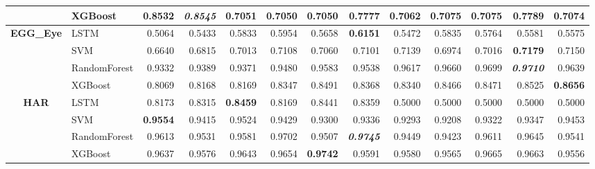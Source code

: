 \begin{table}[H]
\begin{adjustbox}{max width=14cm}
\begin{tabular}{|c|l|r|r|r|r|r|r|r|r|r|r|r|}
			                      & XGBoost      & 0.8532                   & \textit{\textbf{0.8545}} & 0.7051          & 0.7050 & 0.7050          & 0.7777                   & 0.7062                   & 0.7075                   & 0.7075 & 0.7789                   & 0.7074          \\
			\hline
			\textbf{EGG\_Eye}     & LSTM         & 0.5064                   & 0.5433                   & 0.5833          & 0.5954 & 0.5658          & \textbf{0.6151}          & 0.5472                   & 0.5835                   & 0.5764 & 0.5581                   & 0.5575          \\
			                      & SVM          & 0.6640                   & 0.6815                   & 0.7013          & 0.7108 & 0.7060          & 0.7101                   & 0.7139                   & 0.6974                   & 0.7016 & \textbf{0.7179}          & 0.7150          \\
			                      & RandomForest & 0.9332                   & 0.9389                   & 0.9371          & 0.9480 & 0.9583          & 0.9538                   & 0.9617                   & 0.9660                   & 0.9699 & \textit{\textbf{0.9710}} & 0.9639          \\
			                      & XGBoost      & 0.8069                   & 0.8168                   & 0.8169          & 0.8347 & 0.8491          & 0.8368                   & 0.8340                   & 0.8466                   & 0.8471 & 0.8525                   & \textbf{0.8656} \\
			\hline
			\textbf{HAR}          & LSTM         & 0.8173                   & 0.8315                   & \textbf{0.8459} & 0.8169 & 0.8441          & 0.8359                   & 0.5000                   & 0.5000                   & 0.5000 & 0.5000                   & 0.5000          \\
			                      & SVM          & \textbf{0.9554}          & 0.9415                   & 0.9524          & 0.9429 & 0.9300          & 0.9336                   & 0.9293                   & 0.9208                   & 0.9322 & 0.9347                   & 0.9453          \\
			                      & RandomForest & 0.9613                   & 0.9531                   & 0.9581          & 0.9702 & 0.9507          & \textit{\textbf{0.9745}} & 0.9449                   & 0.9423                   & 0.9611 & 0.9645                   & 0.9541          \\
			                      & XGBoost      & 0.9637                   & 0.9576                   & 0.9643          & 0.9654 & \textbf{0.9742} & 0.9591                   & 0.9580                   & 0.9565                   & 0.9665 & 0.9663                   & 0.9556          \\

\end{tabular}
\end{adjustbox}
\end{table}
